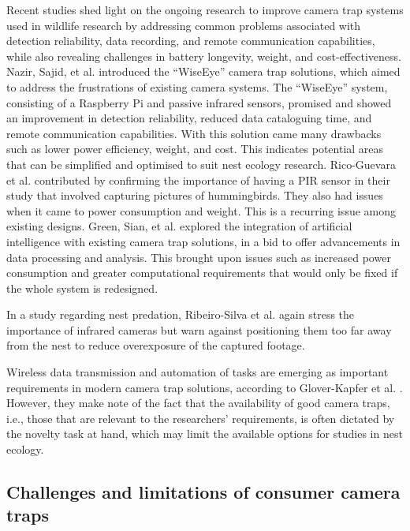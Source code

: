 \documentclass[class=report,11pt,crop=false]{standalone}
\begin{document}
Recent studies shed light on the ongoing research to improve camera trap systems used in wildlife research by addressing common problems associated with detection reliability, data recording, and remote communication capabilities, while also revealing challenges in battery longevity, weight, and cost-effectiveness. Nazir, Sajid, et al. \cite{nazir2017wiseeye} introduced the “WiseEye” camera trap solutions, which aimed to address the frustrations of existing camera systems. The “WiseEye” system, consisting of a Raspberry Pi and passive infrared sensors, promised and showed an improvement in detection reliability, reduced data cataloguing time, and remote communication capabilities. With this solution came many drawbacks such as lower power efficiency, weight, and cost. This indicates potential areas that can be simplified and optimised to suit nest ecology research. Rico-Guevara et al. \cite{rico-guevara2017bring} contributed by confirming the importance of having a PIR sensor in their study that involved capturing pictures of hummingbirds. They also had issues when it came to power consumption and weight. This is a recurring issue among existing designs. Green, Sian, et al. \cite{green2020innovations} explored the integration of artificial intelligence with existing camera trap solutions, in a bid to offer advancements in data processing and analysis. This brought upon issues such as increased power consumption and greater computational requirements that would only be fixed if the whole system is redesigned. 

In a study regarding nest predation, Ribeiro-Silva et al. \cite{ribeiro-silva2018testing} again stress the importance of infrared cameras but warn against positioning them too far away from the nest to reduce overexposure of the captured footage.

Wireless data transmission and automation of tasks are emerging as important requirements in modern camera trap solutions, according to Glover-Kapfer et al. \cite{glover2019camera}. However, they make note of the fact that the availability of good camera traps, i.e., those that are relevant to the researchers’ requirements, is often dictated by the novelty task at hand, which may limit the available options for studies in nest ecology.  

\subsection{Challenges and limitations of consumer camera traps}
\end{document}
